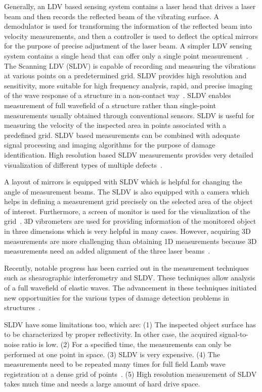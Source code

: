 \documentclass[b5paper, 11pt, titlepage]{book}
\begin{document}
Generally, an LDV based sensing system contains a laser head that drives a laser beam and then records the reflected beam of the vibrating surface. A demodulator is used for transforming the information of the reflected beam into velocity measurements, and then a controller is used to deflect the optical mirrors for the purpose of precise adjustment of the laser beam. A simpler LDV sensing system contains a single head that can offer only a single point measurement~\cite{Mitra2016}. The Scanning LDV (SLDV) is capable of recording and measuring the vibrations at various points on a predetermined grid. SLDV provides high resolution and sensitivity, more suitable for high frequency analysis, rapid, and precise imaging of the wave response of a structure in a non-contact way~\cite{Mitra2016}. SLDV enables measurement of full wavefield of a structure rather than single-point measurements usually obtained through conventional sensors. SLDV is useful for measuring the velocity of the inspected area in points associated with a predefined grid. SLDV based measurements can be combined with adequate signal processing and imaging algorithms for the purpose of damage identification. High resolution based SLDV measurements provides very detailed visualization of different types of multiple defects~\cite{Kudela2015}.

A layout of mirrors is equipped with SLDV which is helpful for changing the angle of measurement beams. The SLDV is also equipped with a camera which helps in defining a measurement grid precisely on the selected area of the object of interest. Furthermore, a screen of monitor is used for the visualization of the grid~\cite{Ostachowicz2014}. 3D vibrometers are used for providing information of the monitored object in three dimensions which is very helpful in many cases. However, acquiring 3D measurements are more challenging than obtaining 1D measurements because 3D measurements need an added alignment of the three laser beams~\cite{Ostachowicz2014}.

Recently, notable progress has been carried out in the measurement techniques such as shearographic interferometry and SLDV. These techniques allow analysis of a full wavefield of elastic waves. The advancement in these techniques initiated new opportunities for the various types of damage detection problems in structures~\cite{Mitra2016}.

SLDV have some limitations too, which are: (1) The inspected object surface has to be characterized by proper reflectivity. In other case, the acquired signal-to-noise ratio is low. (2) For a specified time, the measurements can only be performed at one point in space. (3) SLDV is very expensive. (4) The measurements need to be repeated many times for full field Lamb wave registration at a dense grid of points~\cite{Ostachowicz2014}.
(5) High resolution measurement of SLDV takes much time and needs a large amount of hard drive space.
\end{document}
